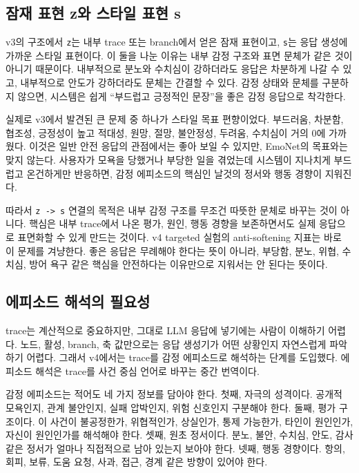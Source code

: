 \documentclass[11pt,a4paper]{article}
\newcommand{\eng}[1]{\texttt{#1}}
\begin{document}
\subsection{잠재 표현 z와 스타일 표현 s}

v3의 구조에서 \eng{z}는 내부 trace 또는 branch에서 얻은 잠재 표현이고, \eng{s}는 응답 생성에 가까운 스타일 표현이다. 이 둘을 나눈 이유는 내부 감정 구조와 표면 문체가 같은 것이 아니기 때문이다. 내부적으로 분노와 수치심이 강하더라도 응답은 차분하게 나갈 수 있고, 내부적으로 안도가 강하더라도 문체는 간결할 수 있다. 감정 상태와 문체를 구분하지 않으면, 시스템은 쉽게 ``부드럽고 긍정적인 문장''을 좋은 감정 응답으로 착각한다.

실제로 v3에서 발견된 큰 문제 중 하나가 스타일 목표 편향이었다. 부드러움, 차분함, 협조성, 긍정성이 높고 적대성, 원망, 절망, 불안정성, 두려움, 수치심이 거의 0에 가까웠다. 이것은 일반 안전 응답의 관점에서는 좋아 보일 수 있지만, EmoNet의 목표와는 맞지 않는다. 사용자가 모욕을 당했거나 부당한 일을 겪었는데 시스템이 지나치게 부드럽고 온건하게만 반응하면, 감정 에피소드의 핵심인 날것의 정서와 행동 경향이 지워진다.

따라서 \eng{z -> s} 연결의 목적은 내부 감정 구조를 무조건 따뜻한 문체로 바꾸는 것이 아니다. 핵심은 내부 trace에서 나온 평가, 원인, 행동 경향을 보존하면서도 실제 응답으로 표면화할 수 있게 만드는 것이다. v4 targeted 실험의 anti-softening 지표는 바로 이 문제를 겨냥한다. 좋은 응답은 무례해야 한다는 뜻이 아니라, 부당함, 분노, 위협, 수치심, 방어 욕구 같은 핵심을 안전하다는 이유만으로 지워서는 안 된다는 뜻이다.

\subsection{에피소드 해석의 필요성}

trace는 계산적으로 중요하지만, 그대로 LLM 응답에 넣기에는 사람이 이해하기 어렵다. 노드, 활성, branch, 축 값만으로는 응답 생성기가 어떤 상황인지 자연스럽게 파악하기 어렵다. 그래서 v4에서는 trace를 감정 에피소드로 해석하는 단계를 도입했다. 에피소드 해석은 trace를 사건 중심 언어로 바꾸는 중간 번역이다.

감정 에피소드는 적어도 네 가지 정보를 담아야 한다. 첫째, 자극의 성격이다. 공개적 모욕인지, 관계 불안인지, 실패 압박인지, 위험 신호인지 구분해야 한다. 둘째, 평가 구조이다. 이 사건이 불공정한가, 위협적인가, 상실인가, 통제 가능한가, 타인이 원인인가, 자신이 원인인가를 해석해야 한다. 셋째, 원초 정서이다. 분노, 불안, 수치심, 안도, 감사 같은 정서가 얼마나 직접적으로 남아 있는지 보아야 한다. 넷째, 행동 경향이다. 항의, 회피, 보류, 도움 요청, 사과, 접근, 경계 같은 방향이 있어야 한다.
\end{document}

